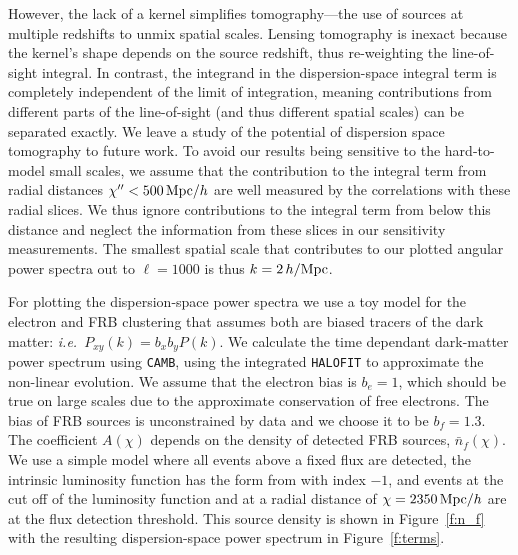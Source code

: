 \documentclass[twocolumn,prl,floatfix]{revtex4-1}
\begin{document}
However, the lack of a kernel simplifies tomography---the use of sources at
multiple redshifts to unmix spatial scales.
Lensing tomography is inexact because the kernel's shape depends on
the source redshift, thus re-weighting the line-of-sight integral.
In contrast, the integrand in the dispersion-space integral
term is completely independent of the limit of integration, meaning
contributions from different parts of the line-of-sight (and thus different
spatial scales) can be separated exactly. We leave a study of the potential of dispersion space
tomography to future work.  To avoid our results being
sensitive to the hard-to-model small scales, we assume that the contribution to the
integral term from radial distances $\chi'' < 500\,{\rm Mpc}/h$ are well
measured by the correlations with these radial slices. We thus ignore
contributions to the integral term from below this distance and neglect the
information from these slices in our sensitivity measurements. The smallest
spatial scale that contributes to our plotted angular power spectra out to
$\ell=1000$ is thus $k=2\,h/{\rm Mpc}$.

For plotting the dispersion-space power spectra we use a toy model for the electron and
FRB clustering that assumes both are biased tracers of the dark matter:
\emph{i.e.}~$P_{xy}(k)=b_x b_y P(k)$.  We
calculate the time dependant dark-matter power spectrum using {\tt CAMB}, using
the integrated {\tt HALOFIT} to approximate the non-linear evolution. We assume
that the electron bias is $b_e=1$, which should be true on large scales due to
the approximate conservation of free electrons. The bias of FRB sources is
unconstrained by data and we choose it to be $b_f=1.3$. The coefficient
$A(\chi)$ depends on the density of detected FRB sources, $\bar n_f(\chi)$.
We use a simple model where all events above a fixed flux are detected,
the intrinsic luminosity function has the form from
\citet{1976ApJ...203..297S} with index $-1$, and events at the cut off of the
luminosity function and at
a radial distance of $\chi=2350\,{\rm Mpc}/h$ are at the flux detection threshold.
This source density is shown in Figure~\ref{f:n_f} with the resulting dispersion-space
power spectrum in Figure~\ref{f:terms}.
\end{document}
